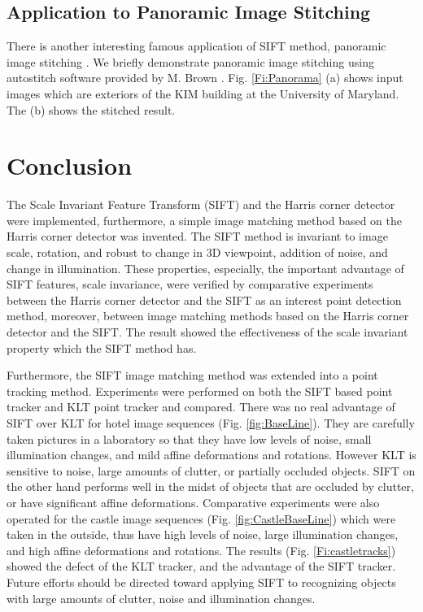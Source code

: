 \documentclass{article}
\begin{document}

\subsection{Application to Panoramic Image Stitching}

There is another interesting famous application of SIFT method, 
panoramic image stitching \cite{mBrown03}. 
We briefly demonstrate panoramic image stitching using autostitch software provided by M. Brown \cite{mBrown07}. 
Fig. \ref{Fi:Panorama} (a) shows input images which are exteriors of the KIM building at the University of Maryland. 
The (b) shows the stitched result. 

\section{Conclusion}

The Scale Invariant Feature Transform (SIFT) \cite{dLowe04} and the Harris corner detector \cite{cHarris88} were implemented, furthermore, a simple image matching method based on the Harris corner detector was invented. The SIFT method is invariant to image scale, rotation, and robust to change in 3D viewpoint, addition of noise, and change in illumination. These properties, especially, the important advantage of SIFT features, scale invariance, were verified by comparative experiments between the Harris corner detector and the SIFT as an interest point detection method, moreover, between image matching methods based on the Harris corner detector and the SIFT. The result showed the effectiveness of the scale invariant property which the SIFT method has. 

Furthermore, the SIFT image matching method was extended into a point tracking method. 
Experiments were performed on both the SIFT based point tracker and KLT point tracker and compared. 
There was no real advantage of SIFT over KLT for hotel image sequences (Fig. \ref{fig:BaseLine}). They are carefully taken pictures in a laboratory so that they have low levels of noise, small illumination changes, and mild affine deformations and rotations.  
However KLT is sensitive to noise, large amounts of clutter, or partially occluded objects.  
SIFT on the other hand performs well in the midst of objects that are occluded by clutter, or have significant affine deformations. 
Comparative experiments were also operated for the castle image sequences (Fig. \ref{fig:CastleBaseLine}) which were taken in the outside, thus have high levels of noise, large illumination changes, and high affine deformations and rotations. 
The results (Fig. \ref{Fi:castletracks}) showed the defect of the KLT tracker, and the advantage of the SIFT tracker. 
Future efforts should be directed toward applying SIFT to recognizing objects with large amounts of clutter, noise and illumination changes.  
\end{document}
